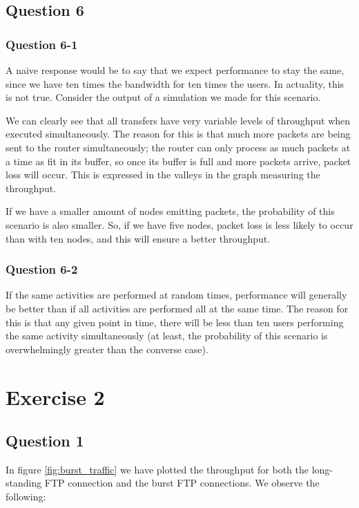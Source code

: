 \documentclass[10pt,a4paper]{article}
\begin{document}
\subsection{Question 6}

\subsubsection{Question 6-1}
A naive response would be to say that we expect performance to stay
the same, since we have ten times the bandwidth for ten times the
users. In actuality, this is not true. Consider the output of a
simulation we made for this scenario.

We can clearly see that all transfers have very variable levels of
throughput when executed simultaneously. The reason for this is that
much more packets are being sent to the router simultaneously; the
router can only process as much packets at a time as fit in its
buffer, so once its buffer is full and more packets arrive, packet
loss will occur. This is expressed in the valleys in the graph
measuring the throughput.

If we have a smaller amount of nodes emitting packets, the probability
of this scenario is also smaller. So, if we have five nodes, packet
loss is less likely to occur than with ten nodes, and this will ensure
a better throughput.

\subsubsection{Question 6-2}

If the same activities are performed at random times, performance will
generally be better than if all activities are performed all at the same
time. The reason for this is that any given point in time, there will
be less than ten users performing the same activity simultaneously (at
least, the probability of this scenario is overwhelmingly greater than
the converse case). 


\section{Exercise 2}
\subsection{Question 1}

In figure \ref{fig:burst_traffic} we have plotted the throughput for
both the long-standing FTP connection and the burst FTP
connections. We observe the following:
\end{document}
